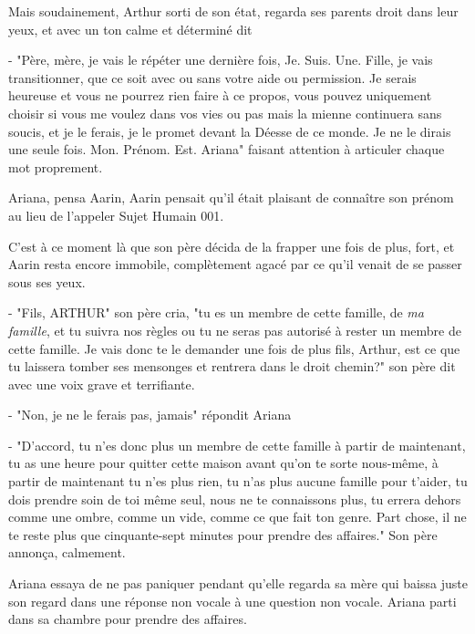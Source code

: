 \documentclass[12pt,hidelinks,a4paper]{book}
\begin{document}
Mais soudainement, Arthur sorti de son état, regarda ses parents droit dans leur yeux, et avec un ton calme et déterminé dit\par
- "Père, mère, je vais le répéter une dernière fois, Je. Suis. Une. Fille, je vais transitionner, que ce soit avec ou sans votre
aide ou permission. Je serais heureuse et vous ne pourrez rien faire à ce propos, vous pouvez uniquement choisir si vous 
me voulez dans vos vies ou pas mais la mienne continuera sans soucis, et je le ferais, je le promet devant la Déesse de ce monde. 
Je ne le dirais une seule fois. Mon. Prénom. Est. Ariana" faisant attention à articuler chaque mot proprement.\par 
\bigskip

Ariana, pensa Aarin, Aarin pensait qu'il était plaisant de connaître son prénom au lieu de l'appeler Sujet Humain 001. \par 
\bigskip
C'est à ce moment là que son père décida de la frapper une fois de plus, fort, et Aarin resta encore immobile, complètement 
agacé par ce qu'il venait de se passer sous ses yeux.\par 
\bigskip

- "Fils, ARTHUR" son père cria, "tu es un membre de cette famille, de \textit{ma famille}, et tu suivra nos règles
ou tu ne seras pas autorisé à rester un membre de cette famille. Je vais donc te le demander une fois de plus fils, 
Arthur, est ce que tu laissera tomber ses mensonges et rentrera dans le droit chemin?" son père dit avec une 
voix grave et terrifiante.\par 
\bigskip

- "Non, je ne le ferais pas, jamais" répondit Ariana\par \bigskip
- "D'accord, tu n'es donc plus un membre de cette famille à partir de maintenant, tu as une heure pour quitter cette 
maison avant qu'on te sorte nous-même, à partir de maintenant tu n'es plus rien, tu n'as plus aucune famille pour t'aider,
tu dois prendre soin de toi même seul, nous ne te connaissons plus, tu errera dehors comme une ombre, comme un vide, 
comme ce que fait ton genre. Part chose, il ne te reste plus que cinquante-sept minutes pour prendre des affaires." Son père 
annonça, calmement.\par \bigskip

Ariana essaya de ne pas paniquer pendant qu'elle regarda sa mère qui baissa juste son regard dans une réponse 
non vocale à une question non vocale. Ariana parti dans sa chambre pour prendre des affaires.
\end{document}
